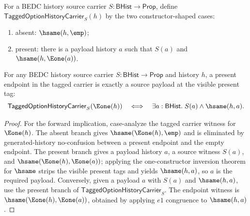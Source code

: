 \begin{definition}
\label{def:tagged-option-history-carrier}
For a BEDC history source carrier $S:\mathsf{BHist}\to\mathsf{Prop}$, define $\mathsf{TaggedOptionHistoryCarrier}_S(h)$ by the two constructor-shaped cases:
\begin{enumerate}
  \item absent: $\hsame(h,\emp)$;
  \item present: there is a payload history $a$ such that $S(a)$ and $\hsame(h,\Eone(a))$.
\end{enumerate}
\end{definition}

\begin{theorem}
\label{thm:tagged-option-history-present-exactness}
For any BEDC history source carrier $S:\mathsf{BHist}\to\mathsf{Prop}$ and
history $h$, a present endpoint in the tagged carrier is exactly a source
payload at the visible present tag:
$$
\mathsf{TaggedOptionHistoryCarrier}_S(\Eone(h))
\quad\Longleftrightarrow\quad
\exists a:\mathsf{BHist}.\; S(a)\land \hsame(h,a).
$$
\end{theorem}
\begin{proof}
For the forward implication, case-analyze the tagged carrier witness for
$\Eone(h)$. The absent branch gives $\hsame(\Eone(h),\emp)$ and is eliminated
by generated-history no-confusion between a present endpoint and the empty
endpoint. The present branch gives a payload history $a$, a source witness
$S(a)$, and $\hsame(\Eone(h),\Eone(a))$; applying the one-constructor inversion
theorem for $\hsame$ strips the visible present tags and yields $\hsame(h,a)$,
so $a$ is the required payload. Conversely, given a payload $a$ with $S(a)$ and
$\hsame(h,a)$, use the present branch of
$\mathsf{TaggedOptionHistoryCarrier}_S$. The endpoint witness is
$\hsame(\Eone(h),\Eone(a))$, obtained by applying $e1$ congruence to
$\hsame(h,a)$.
\end{proof}

